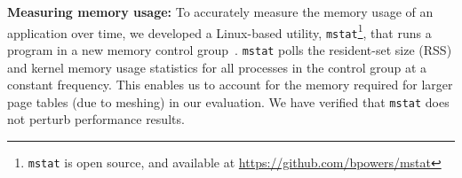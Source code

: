 \textbf{Measuring memory usage:} To accurately measure the memory
usage of an application over time, we developed a Linux-based utility,
\texttt{mstat}\footnote{\texttt{mstat} is open source, and available at \url{https://github.com/bpowers/mstat}}, that runs a program in a new memory control
group~\cite{redhat:cgroups}. \texttt{mstat} polls the resident-set size
(RSS) and kernel memory usage statistics for all processes in the
control group at a constant frequency.  This enables us to account for
the memory required for larger page tables (due to meshing) in our
evaluation. We have verified that \texttt{mstat} does not perturb
performance results.

